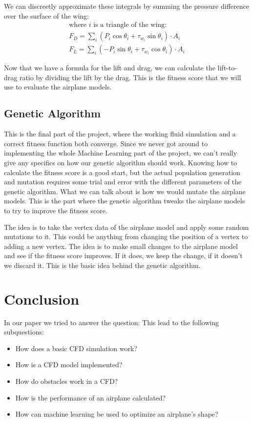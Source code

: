 \documentclass[a4paper,12pt,titlepage]{article}
\begin{document}
We can discreetly approximate these integrals by summing the pressure difference
over the surface of the wing:
\[
	\begin{array}{l}
		\text{where $i$ is a triangle of the wing:} \\
		F_D = \sum\limits_i (P_i \cos \theta_i + \tau_{w_i} \sin \theta_i) \cdot A_i \\
		F_L = \sum\limits_i (-P_i \sin \theta_i + \tau_{w_i} \cos \theta_i) \cdot A_i
	\end{array}
\]

Now that we have a formula for the lift and drag, we can calculate the lift-to-drag
ratio by dividing the lift by the drag. This is the fitness score that we will
use to evaluate the airplane models.

\subsection{Genetic Algorithm} \label{genalg}
This is the final part of the project, where the working fluid simulation and a
correct fitness function both converge. Since we never got around to implementing
the whole Machine Learning part of the project, we can't really give any specifics
on how our genetic algorithm should work. Knowing how to calculate the fitness
score is a good start, but the actual population generation and mutation requires
some trial and error with the different parameters of the genetic algorithm.
What we can talk about is how we would mutate the airplane models. This is the
part where the genetic algorithm tweaks the airplane models to try to improve
the fitness score.

The idea is to take the vertex data of the airplane model and apply some random
mutations to it. This could be anything from changing the position of a vertex
to adding a new vertex. The idea is to make small changes to the airplane model
and see if the fitness score improves. If it does, we keep the change, if it
doesn't we discard it. This is the basic idea behind the genetic algorithm.

\pagebreak
\section{Conclusion}
In our paper we tried to answer the question: 
This lead to the following subquestions: 

\begin{itemize}
	\item{How does a basic CFD simulation work?}
	\item{How is a CFD model implemented?}
	\item{How do obstacles work in a CFD?}
	\item{How is the performance of an airplane calculated?}
	\item{How can machine learning be used to optimize an airplane's shape?}
\end{itemize}
\end{document}
